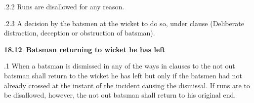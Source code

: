 \documentclass[12pt]{article}
\begin{document}
\vspace{\baselineskip}
\begin{adjustwidth}{0.49in}{0.0in}
{\fontsize{9pt}{10.8pt}.2.2 \tabto{1.17in} Runs are disallowed for any reason.\par}\par

\end{adjustwidth}


\vspace{\baselineskip}
\begin{adjustwidth}{1.18in}{0.29in}
{\fontsize{9pt}{10.8pt}.2.3 \tabto{1.17in} A decision by the batsmen at the wicket to do so, under clause (Deliberate distraction, deception or obstruction of batsman).\par}\par

\end{adjustwidth}


\vspace{\baselineskip}
{\fontsize{11pt}{13.2pt}\selectfont \textbf{18.12\  Batsman returning to wicket he has left}\par}\par


\vspace{\baselineskip}
\begin{adjustwidth}{0.5in}{0.07in}
{\fontsize{9pt}{10.8pt}.1 When a batsman is dismissed in any of the ways in clauses to the not out batsman shall return to the wicket he has left but only if the batsmen had not already crossed at the instant of the incident causing the dismissal. If runs are to be disallowed, however, the not out batsman shall return to his original end.\par}\par

\end{adjustwidth}


\vspace{\baselineskip}

\vspace{\baselineskip}

\vspace{\baselineskip}

\vspace{\baselineskip}

\vspace{\baselineskip}
\begin{Center}
{\fontsize{8pt}{9.6pt}\par}
\end{Center}\par
\end{document}
